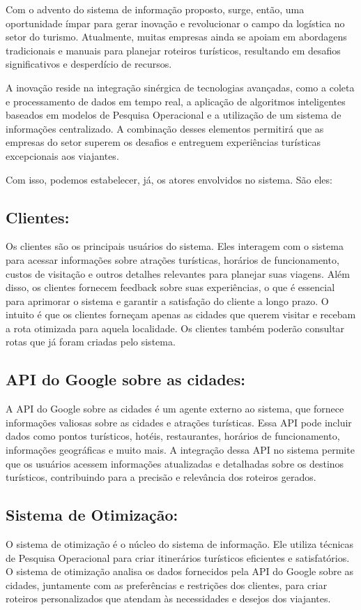 Com o advento do sistema de informação proposto, surge, então, uma oportunidade ímpar para gerar inovação e revolucionar o campo da logística no setor do turismo. Atualmente, muitas empresas ainda se apoiam em abordagens tradicionais e manuais para planejar roteiros turísticos, resultando em desafios significativos e desperdício de recursos.

A inovação reside na integração sinérgica de tecnologias avançadas, como a coleta e processamento de dados em tempo real, a aplicação de algoritmos inteligentes baseados em modelos de Pesquisa Operacional e a utilização de um sistema de informações centralizado. A combinação desses elementos permitirá que as empresas do setor superem os desafios e entreguem experiências turísticas excepcionais aos viajantes.

Com isso, podemos estabelecer, já, os atores envolvidos no sistema. São eles:

\subsection{Clientes:} 
Os clientes são os principais usuários do sistema. Eles interagem com o sistema para acessar informações sobre atrações turísticas, horários de funcionamento, custos de visitação e outros detalhes relevantes para planejar suas viagens. Além disso, os clientes fornecem feedback sobre suas experiências, o que é essencial para aprimorar o sistema e garantir a satisfação do cliente a longo prazo. O intuito é que os clientes forneçam apenas as cidades que querem visitar e recebam a rota otimizada para aquela localidade. Os clientes também poderão consultar rotas que já foram criadas pelo sistema.

\subsection{API do Google sobre as cidades:} 
A API do Google sobre as cidades é um agente externo ao sistema, que fornece informações valiosas sobre as cidades e atrações turísticas. Essa API pode incluir dados como pontos turísticos, hotéis, restaurantes, horários de funcionamento, informações geográficas e muito mais. A integração dessa API no sistema permite que os usuários acessem informações atualizadas e detalhadas sobre os destinos turísticos, contribuindo para a precisão e relevância dos roteiros gerados.

\subsection{Sistema de Otimização:} 
O sistema de otimização é o núcleo do sistema de informação. Ele utiliza técnicas de Pesquisa Operacional para criar itinerários turísticos eficientes e satisfatórios. O sistema de otimização analisa os dados fornecidos pela API do Google sobre as cidades, juntamente com as preferências e restrições dos clientes, para criar roteiros personalizados que atendam às necessidades e desejos dos viajantes.

